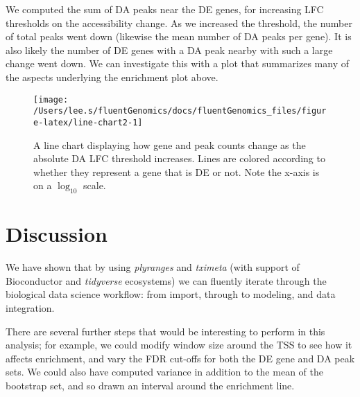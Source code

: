 \documentclass[
]{article}
\newenvironment{Shaded}{}{}
\newcommand{\DataTypeTok}[1]{\textcolor[rgb]{0.56,0.13,0.00}{#1}}
\newcommand{\DecValTok}[1]{\textcolor[rgb]{0.25,0.63,0.44}{#1}}
\newcommand{\KeywordTok}[1]{\textcolor[rgb]{0.00,0.44,0.13}{\textbf{#1}}}
\newcommand{\NormalTok}[1]{#1}
\newcommand{\OperatorTok}[1]{\textcolor[rgb]{0.40,0.40,0.40}{#1}}
\newcommand{\StringTok}[1]{\textcolor[rgb]{0.25,0.44,0.63}{#1}}
\begin{document}
We computed the sum of DA peaks near the DE genes, for increasing LFC
thresholds on the accessibility change. As we increased the threshold, the
number of total peaks went down (likewise the mean number of DA peaks per
gene). It is also likely the number of DE genes with a DA peak nearby with such
a large change went down. We can investigate this with a plot that summarizes
many of the aspects underlying the enrichment plot above.

\begin{Shaded}
\end{Shaded}

\begin{figure}

{\centering \texttt{[image: /Users/lee.s/fluentGenomics/docs/fluentGenomics\_files/figure-latex/line-chart2-1]} 

}

\caption{A line chart displaying how gene and peak counts change as the absolute DA LFC threshold increases. Lines are colored according to whether they represent a gene that is DE or not. Note the x-axis is on a \(\log_{10}\) scale.}\label{fig:line-chart2}
\end{figure}

\hypertarget{discussion}{%
\section{Discussion}\label{discussion}}

We have shown that by using \emph{plyranges} and \emph{tximeta} (with support of
Bioconductor and \emph{tidyverse} ecosystems) we can fluently iterate through the
biological data science workflow: from import, through to modeling, and data
integration.

There are several further steps that would be interesting to perform in this
analysis; for example, we could modify window size around the TSS to see how it
affects enrichment, and vary the FDR cut-offs for both the DE gene and DA peak
sets. We could also have computed variance in addition to the mean of the
bootstrap set, and so drawn an interval around the enrichment line.
\end{document}

